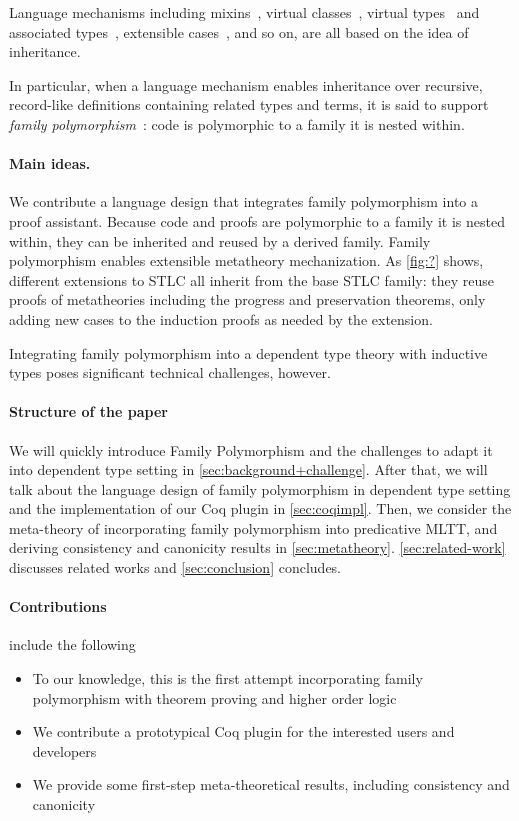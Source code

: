Language mechanisms including
mixins~\cite{mixin-1990},
virtual classes~\cite{virtualclasses-1989,vc-calculus-2006},
virtual types~\cite{thorup97} and associated types~\cite{ckj05},
extensible cases~\cite{bac2006},
and so on, are all based on the idea of inheritance.

In particular, when a language mechanism enables inheritance over
recursive, record-like definitions containing related types and terms,
it is said to support \emph{family polymorphism}~\cite{ernst2001family}:
code is polymorphic to a family it is nested within.

\paragraph{Main ideas.}

We contribute a language design that integrates family polymorphism into
a proof assistant.
Because code and proofs are polymorphic to a family it is nested
within, they can be inherited and reused by a derived family.
%
Family polymorphism enables extensible metatheory mechanization.
As \cref{fig:?} shows,
different extensions to STLC all inherit from the base STLC family:
they reuse proofs of metatheories including the progress and
preservation theorems, only adding new cases to the induction proofs as
needed by the extension.

Integrating family polymorphism into a dependent type theory with
inductive types poses significant technical challenges, however.
\TODO

\paragraph{Structure of the paper} 
We will quickly introduce Family Polymorphism and the challenges to adapt it into dependent type setting in \cref{sec:background+challenge}. After that, we will talk about the language design of family polymorphism in dependent type setting and the implementation of our Coq plugin in \cref{sec:coqimpl}. Then, we consider the meta-theory of incorporating family polymorphism into predicative MLTT, and deriving consistency and canonicity results in \cref{sec:metatheory}. \ref{sec:related-work} discusses related works and \ref{sec:conclusion} concludes.


\paragraph{Contributions} include the following
\begin{itemize}
  \item To our knowledge, this is the first attempt incorporating family polymorphism with theorem proving and higher order logic
  \item We contribute a prototypical Coq plugin for the interested users and developers 
  \item We provide some first-step meta-theoretical results, including consistency and canonicity
\end{itemize}
